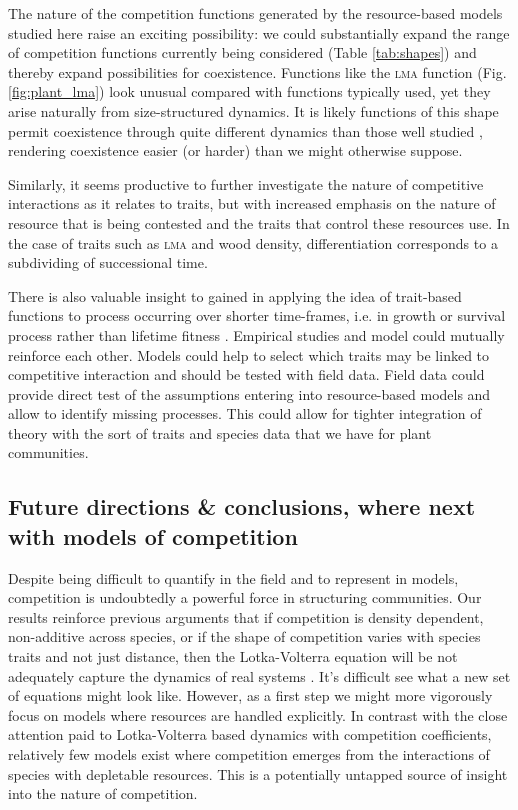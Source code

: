 \documentclass[a4paper,11pt]{article}
\begin{document}
The nature of the competition functions generated by the
resource-based models studied here raise an exciting possibility: we
could substantially expand the range of competition functions
currently being considered (Table \ref{tab:shapes}) and thereby expand
possibilities for coexistence. Functions like the \textsc {lma} function
(Fig. \ref{fig:plant_lma}) look unusual compared with functions
typically used, yet they arise naturally from size-structured
dynamics.  It is likely functions of this shape permit coexistence
through quite different dynamics than those well studied
\citep[e.g.][]{Leimar-2013}, rendering coexistence easier (or harder)
than we might otherwise suppose.

Similarly, it seems productive to further investigate the nature of
competitive interactions as it relates to traits, but with increased
emphasis on the nature of resource that is being contested and the traits that control these resources use. In the
case of traits such as \textsc{lma} and wood density, differentiation
corresponds to a subdividing of successional time. 

There is also valuable insight to gained in applying the idea of 
trait-based functions
to process occurring over shorter time-frames, i.e. in growth or
survival process rather than lifetime fitness
\citep[e.g.][]{Kunstler-2012, Lasky-2015, Kraft-2015}.  Empirical studies and model could mutually reinforce each other. Models could help to select which traits may be linked to competitive interaction and should be tested with field data. Field data could provide direct test of the assumptions entering into
resource-based models and allow to identify missing processes. This could allow for tighter integration of
theory with the sort of traits and species data that we have for plant
communities.

\subsection{Future directions \& conclusions, where next with models of
competition}

Despite being difficult to quantify in the field and to represent in
models, competition is undoubtedly a powerful force in structuring
communities.
%
Our results reinforce previous arguments that if competition is
density dependent, non-additive across species, or if the shape of
competition varies with species traits and not just distance, then the
Lotka-Volterra equation will be not adequately capture the dynamics of
real systems \citep{Andrewartha-1953, Neill-1974, Abrams-1975,
  Wangersky-1978,Abrams-1980, Tilman-1987}.  It's difficult see what a
new set of equations might look like.  However, as a first step we
might more vigorously focus on models where resources are handled
explicitly.  In contrast with the close attention
paid to Lotka-Volterra based dynamics with competition coefficients,
relatively few models exist where competition emerges from the
interactions of species with depletable resources. This is a potentially
untapped source of insight into the nature of competition.
\end{document}
